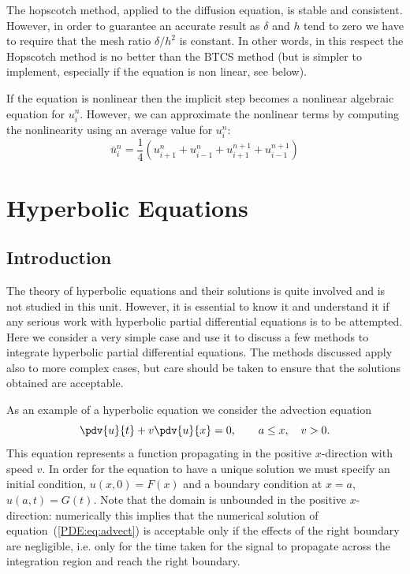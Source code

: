 The hopscotch method, applied to the diffusion equation, is stable and
consistent.  However, in order to guarantee an accurate result as
$\delta$ and $h$ tend to zero we have to require that the mesh ratio
$\delta/h^2$ is constant.  In other words, in this respect the
Hopscotch method is no better than the BTCS method (but is simpler to
implement, especially if the equation is non linear, see below).

If the equation is nonlinear then the implicit step becomes a
nonlinear algebraic equation for $u_{i}^{n}$.  However, we can
approximate the nonlinear terms by computing the nonlinearity using an
average value for $u_{i}^{n}$:
%
\begin{equation}
  \bar{u}_{i}^{n} = \frac{1}{4} ( u_{i+1}^{n} + u_{i-1}^{n} + u_{i+1}^{n+1} +
  u_{i-1}^{n+1} )
  \label{PDE:eq:para:baru}
\end{equation}

\section{Hyperbolic Equations}

\subsection{Introduction}

The theory of hyperbolic equations and their solutions is quite
involved and is not studied in this unit.  However, it is essential to
know it and understand it if any serious work with hyperbolic partial
differential equations is to be attempted.  Here we consider a very
simple case and use it to discuss a few methods to integrate
hyperbolic partial differential equations.  The methods discussed
apply also to more complex cases, but care should be taken to ensure
that the solutions obtained are acceptable.

As an example of a hyperbolic equation we consider the advection
equation
%
\begin{equation}
  \pdv{u}{t} + v \pdv{u}{x} = 0 , \qquad a \le x, \quad v > 0 .
  \label{PDE:eq:advect}
\end{equation}
%
This equation represents a function propagating in the positive
$x$-direction with speed $v$.  In order for the equation to have a
unique solution we must specify an initial condition, $u(x,0) = F(x)$
and a boundary condition at $x=a$, $u(a,t) = G(t)$.  Note that the
domain is unbounded in the positive $x$-direction: numerically this
implies that the numerical solution of equation~(\ref{PDE:eq:advect})
is acceptable only if the effects of the right boundary are
negligible, i.e. only for the time taken for the signal to propagate
across the integration region and reach the right boundary.

